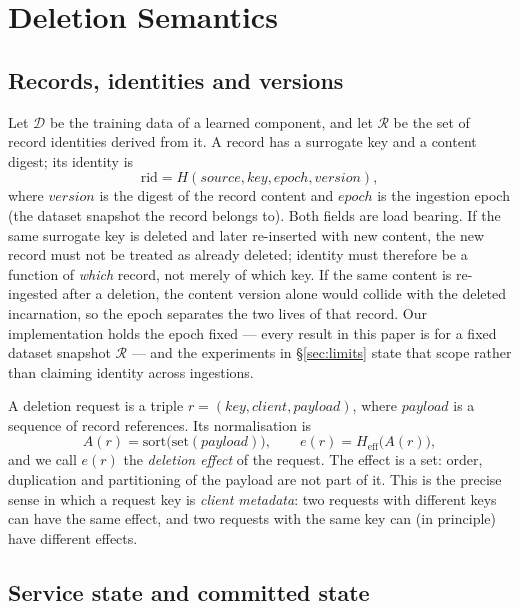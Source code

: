 \documentclass[conference]{IEEEtran}
\newcommand{\Rset}{\mathcal{R}}
\newcommand{\Dset}{\mathcal{D}}
\begin{document}
\section{Deletion Semantics}
\label{sec:semantics}

\subsection{Records, identities and versions}

Let $\Dset$ be the training data of a learned component, and let $\Rset$ be the set
of record identities derived from it.  A record has a surrogate key and a content
digest; its identity is
\begin{equation}
\mathrm{rid} = H(\mathit{source},\mathit{key},\mathit{epoch},\mathit{version}),
\end{equation}
where $\mathit{version}$ is the digest of the record content and $\mathit{epoch}$ is the
ingestion epoch (the dataset snapshot the record belongs to).  Both fields are load
bearing.  If the same surrogate key is deleted and later re-inserted with new content,
the new record must not be treated as already deleted; identity must therefore be a
function of \emph{which} record, not merely of which key.  If the same content is
re-ingested after a deletion, the content version alone would collide with the deleted
incarnation, so the epoch separates the two lives of that record.  Our implementation
holds the epoch fixed --- every result in this paper is for a fixed dataset snapshot
$\Rset$ --- and the experiments in \S\ref{sec:limits} state that scope rather than
claiming identity across ingestions.

A deletion request is a triple $r=(\mathit{key},\mathit{client},\mathit{payload})$,
where $\mathit{payload}$ is a sequence of record references.  Its normalisation is
\begin{equation}
A(r) = \mathrm{sort}\big(\mathrm{set}(\mathit{payload})\big),\qquad
e(r) = H_{\mathrm{eff}}\big(A(r)\big),
\end{equation}
and we call $e(r)$ the \emph{deletion effect} of the request.  The effect is a set:
order, duplication and partitioning of the payload are not part of it.  This is the
precise sense in which a request key is \emph{client metadata}: two requests with
different keys can have the same effect, and two requests with the same key can (in
principle) have different effects.

\subsection{Service state and committed state}
\end{document}
